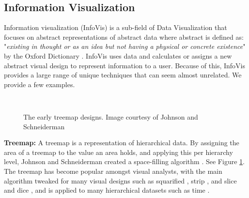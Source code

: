 \subsection{Information Visualization}
Information visualization (InfoVis) is a sub-field of Data Visualization that focuses on abstract representations of abstract data where abstract is defined as: "\textit{existing in thought or as an idea but not having a physical or concrete existence}" by the Oxford Dictionary \cite{abstract}. InfoVis uses data and calculates or assigns a new abstract visual design to represent information to a user. Because of this, InfoVis provides a large range of unique techniques that can seem almost unrelated. We provide a few examples.\\
\begin{figure}[b]
~
\caption{The early treemap designs. Image courtesy of Johnson and Schneiderman  \cite{johnson1991tree} } \label{fig:treemap}
\end{figure}
\textbf{Treemap: }A treemap is a representation of hierarchical data. By assigning the area of a treemap to the value an area holds, and applying this per hierarchy level, Johnson and Schneiderman created a space-filling algorithm \cite{johnson1991tree}. See Figure \ref{fig:treemap}. The treemap has become popular amongst visual analysts, with the main algorithm tweaked for many visual designs such as squarified \cite{bruls2000squarified}, strip \cite{bederson2002ordered}, and slice and dice \cite{shneiderman2001ordered}, and is applied to many hierarchical datasets such as time \cite{roberts2016interactive}.

